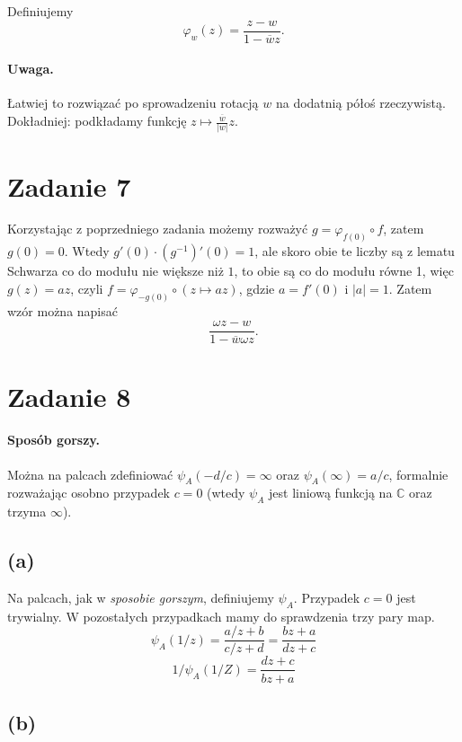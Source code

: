Definiujemy
\[ 
    \varphi_w(z) = \frac{z - w}{1 - \overline{w}z}.
\]


\paragraph{Uwaga.} Łatwiej to rozwiązać po sprowadzeniu rotacją \( w \) na dodatnią półoś rzeczywistą. Dokładniej: podkładamy funkcję \( z \mapsto \frac{\overline{w}}{ \left| w \right|  }z \).

\section*{Zadanie 7}

Korzystając z poprzedniego zadania możemy rozważyć \( g = \varphi_{f(0)} \circ f \), zatem \( g(0) = 0 \). Wtedy \( g'(0) \cdot (g^{-1})'(0) = 1 \), ale skoro obie te liczby są z lematu Schwarza co do modułu nie większe niż \( 1 \), to obie są co do modułu równe 1, więc \( g(z) = az \), czyli \( f = \varphi_{-g(0)} \circ (z \mapsto az) \), gdzie \( a = f'(0) \) i \( |a| = 1 \). Zatem wzór można napisać
\[ 
    \frac{\omega z - w}{1 - \overline{w}\omega z}.
\]

\section*{Zadanie 8}

\paragraph{Sposób gorszy.} Można na palcach zdefiniować \( \psi_A(-d/c) = \infty \) oraz \( \psi_A(\infty) = a/c \), formalnie rozważając osobno przypadek \( c = 0 \) (wtedy \( \psi_A \) jest liniową funkcją na \( \mathbb{C} \) oraz trzyma \( \infty \)).

\subsection*{(a)}
Na palcach, jak w \textit{sposobie gorszym}, definiujemy \( \psi_A \). Przypadek \( c = 0 \) jest trywialny. W pozostałych przypadkach mamy do sprawdzenia trzy pary map.
\[ 
    \psi_A(1/z) = \frac{a/z + b}{c/z + d} = \frac{bz + a}{dz + c} 
\]
\[ 
    1/\psi_A(1/Z) =  \frac{dz + c}{bz + a}
\]

\subsection*{(b)}

